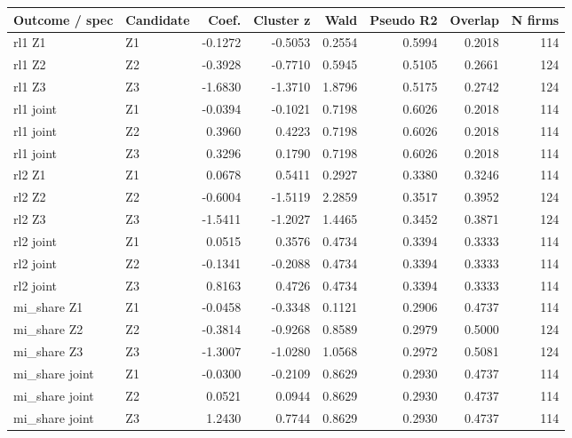 \begingroup\small
\setlength{\tabcolsep}{3pt}
\begin{tabular}{llrrrrrr}
\toprule
Outcome / spec & Candidate & Coef. & Cluster z & Wald & Pseudo R2 & Overlap & N firms \\
\midrule
rl1 Z1 & Z1 & -0.1272 & -0.5053 & 0.2554 & 0.5994 & 0.2018 & 114 \\
rl1 Z2 & Z2 & -0.3928 & -0.7710 & 0.5945 & 0.5105 & 0.2661 & 124 \\
rl1 Z3 & Z3 & -1.6830 & -1.3710 & 1.8796 & 0.5175 & 0.2742 & 124 \\
rl1 joint & Z1 & -0.0394 & -0.1021 & 0.7198 & 0.6026 & 0.2018 & 114 \\
rl1 joint & Z2 & 0.3960 & 0.4223 & 0.7198 & 0.6026 & 0.2018 & 114 \\
rl1 joint & Z3 & 0.3296 & 0.1790 & 0.7198 & 0.6026 & 0.2018 & 114 \\
rl2 Z1 & Z1 & 0.0678 & 0.5411 & 0.2927 & 0.3380 & 0.3246 & 114 \\
rl2 Z2 & Z2 & -0.6004 & -1.5119 & 2.2859 & 0.3517 & 0.3952 & 124 \\
rl2 Z3 & Z3 & -1.5411 & -1.2027 & 1.4465 & 0.3452 & 0.3871 & 124 \\
rl2 joint & Z1 & 0.0515 & 0.3576 & 0.4734 & 0.3394 & 0.3333 & 114 \\
rl2 joint & Z2 & -0.1341 & -0.2088 & 0.4734 & 0.3394 & 0.3333 & 114 \\
rl2 joint & Z3 & 0.8163 & 0.4726 & 0.4734 & 0.3394 & 0.3333 & 114 \\
mi\_share Z1 & Z1 & -0.0458 & -0.3348 & 0.1121 & 0.2906 & 0.4737 & 114 \\
mi\_share Z2 & Z2 & -0.3814 & -0.9268 & 0.8589 & 0.2979 & 0.5000 & 124 \\
mi\_share Z3 & Z3 & -1.3007 & -1.0280 & 1.0568 & 0.2972 & 0.5081 & 124 \\
mi\_share joint & Z1 & -0.0300 & -0.2109 & 0.8629 & 0.2930 & 0.4737 & 114 \\
mi\_share joint & Z2 & 0.0521 & 0.0944 & 0.8629 & 0.2930 & 0.4737 & 114 \\
mi\_share joint & Z3 & 1.2430 & 0.7744 & 0.8629 & 0.2930 & 0.4737 & 114 \\
\bottomrule
\end{tabular}
\par\medskip
